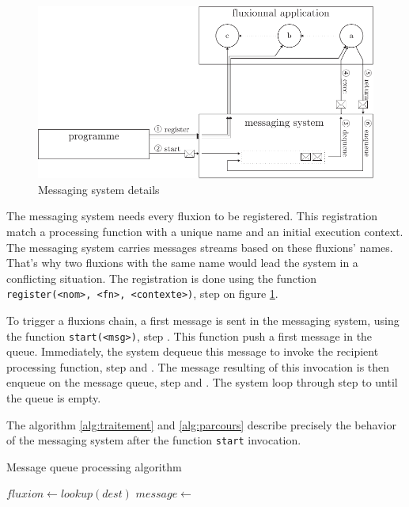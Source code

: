 \begin{figure}[h!]
  \includegraphics[width=\linewidth]{schema-message.pdf}
  \caption{Messaging system details}
  \label{fig:MesSys}
\end{figure}

The messaging system needs every fluxion to be registered.
This registration match a processing function with a unique name and an initial execution context.
The messaging system carries messages streams based on these fluxions' names.
That's why two fluxions with the same name would lead the system in a conflicting situation.
The registration is done using the function \texttt{register(<nom>, <fn>, <contexte>)}, step  on figure \ref{fig:MesSys}.

To trigger a fluxions chain, a first message is sent in the messaging system, using the function \texttt{start(<msg>)}, step .
This function push a first message in the queue.
Immediately, the system dequeue this message to invoke the recipient processing function, step  and .
The message resulting of this invocation is then enqueue on the message queue, step  and .
The system loop through step  to  until the queue is empty.

The algorithm \ref{alg:traitement} and \ref{alg:parcours} describe precisely the behavior of the messaging system after the function \texttt{start} invocation.

\begin{algorithm}
\caption{Message queue processing algorithm}
\label{alg:traitement}
\begin{algorithmic}
\State $fluxion \gets lookup(dest)$
\State $message \gets$  
\State {} 
\EndFor
\EndFunction
\end{algorithmic}
\end{algorithm}

